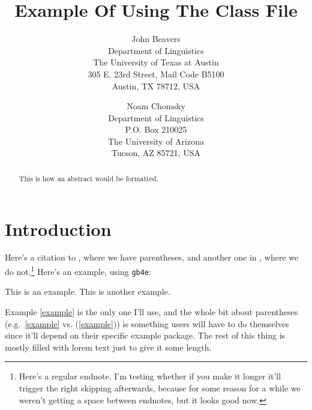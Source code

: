 \documentclass{language}
\begin{document}
\title{Example Of Using The Class File}
\author{John Beavers\\Department of Linguistics\\The University of
  Texas at Austin\\305 E. 23rd Street, Mail Code B5100\\
Austin, TX 78712,
  USA
\and
 Noam Chomsky\\Department of Linguistics\\
P.O. Box 210025\\
The University of Arizona\\
Tucson, AZ 85721, USA}

\date{}

\maketitle

\begin{abstract}
\noindent\normalsize
This is how an abstract would be formatted.


\end{abstract}

\section{Introduction}

Here's a citation to \citet{Dowty79}, where we have parentheses, and
another one in \citealp{Chomsky57}, where we do not.\footnote{Here's a
  regular endnote. I'm testing whether if you make it longer it'll
  trigger the right skipping afterwards, because for some reason for a
  while we weren't getting a space between endnotes, but it looks good
  now.} Here's an example, using {\tt gb4e}:
%
\begin{exe}
  \ex\label{example}
  \begin{xlist}
    \ex This is an example.
    \ex This is another example.
    \end{xlist}
\end{exe}
%
Example \ref{example} is the only one I'll use, and the whole bit
about parentheses (e.g.\ \ref{example} vs. (\ref{example})) is
something users will have to do themselves since it'll depend on their
specific example package. The rest of this thing is mostly filled with
lorem text just to give it some length.
\end{document}
